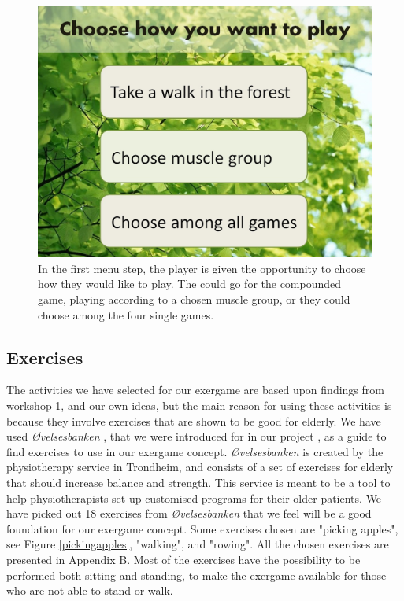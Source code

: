 \begin{figure} [H]
\centering
\includegraphics[scale=0.45]{choosePlay.jpg}
\caption[The menu - start]{In the first menu step, the player is given the opportunity to choose how they would like to play. The could go for the compounded game, playing according to a chosen muscle group, or they could choose among the four single games.}
\label{fig:menuStart}
\end{figure} 

\subsection{Exercises}
The activities we have selected for our exergame are based upon findings from workshop 1, and our own ideas, but the main reason for using these activities is because they involve exercises that are shown to be good for elderly. We have used \emph{Øvelsesbanken} \cite{eldretrening}, that we were introduced for in our project \cite{project}, as a guide to find exercises to use in our exergame concept. \emph{Øvelsesbanken} is created by the physiotherapy service in Trondheim, and consists of a set of exercises for elderly that should increase balance and strength. This service is meant to be a tool to help physiotherapists set up customised programs for their older patients. We have picked out 18 exercises from \emph{Øvelsesbanken} that we feel will be a good foundation for our exergame concept. Some exercises chosen are "picking apples", see Figure \ref{pickingapples}, "walking", and "rowing". All the chosen exercises are presented in Appendix B. Most of the exercises have the possibility to be performed both sitting and standing, to make the exergame available for those who are not able to stand or walk.


